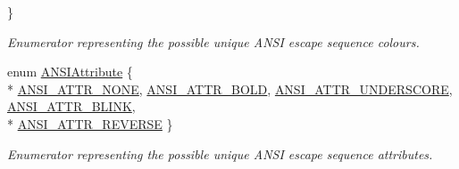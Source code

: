 \begin{DoxyCompactItemize}
 \}\begin{DoxyCompactList}\small\item\em Enumerator representing the possible unique A\+N\+S\+I escape sequence colours. \end{DoxyCompactList}
\item 
enum \hyperlink{namespacechaos_1_1io_1_1format_af01119682ec0bc616b49641e0c2a7ccf}{A\+N\+S\+I\+Attribute} \{ \\*
\hyperlink{namespacechaos_1_1io_1_1format_af01119682ec0bc616b49641e0c2a7ccfa3154b286513beb167bb516ea15f1cfb5}{A\+N\+S\+I\+\_\+\+A\+T\+T\+R\+\_\+\+N\+O\+N\+E}, 
\hyperlink{namespacechaos_1_1io_1_1format_af01119682ec0bc616b49641e0c2a7ccfaada31e77e1e80ea78e0cd08a126271b3}{A\+N\+S\+I\+\_\+\+A\+T\+T\+R\+\_\+\+B\+O\+L\+D}, 
\hyperlink{namespacechaos_1_1io_1_1format_af01119682ec0bc616b49641e0c2a7ccfa2f1d142ccf489cba5710445abd48555f}{A\+N\+S\+I\+\_\+\+A\+T\+T\+R\+\_\+\+U\+N\+D\+E\+R\+S\+C\+O\+R\+E}, 
\hyperlink{namespacechaos_1_1io_1_1format_af01119682ec0bc616b49641e0c2a7ccfacd3671458d96396a0fec66c993244186}{A\+N\+S\+I\+\_\+\+A\+T\+T\+R\+\_\+\+B\+L\+I\+N\+K}, 
\\*
\hyperlink{namespacechaos_1_1io_1_1format_af01119682ec0bc616b49641e0c2a7ccfaa7b58f4c0365d47d2bc98a4587521806}{A\+N\+S\+I\+\_\+\+A\+T\+T\+R\+\_\+\+R\+E\+V\+E\+R\+S\+E}
 \}\begin{DoxyCompactList}\small\item\em Enumerator representing the possible unique A\+N\+S\+I escape sequence attributes. \end{DoxyCompactList}
\end{DoxyCompactItemize}
